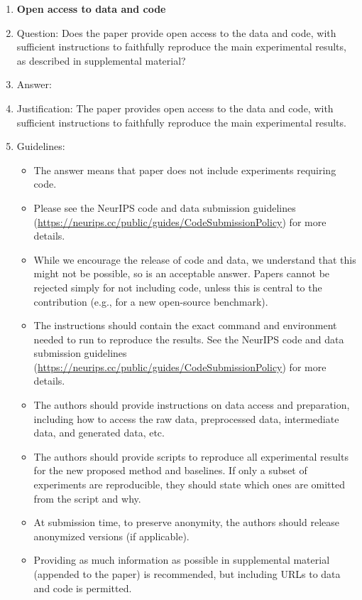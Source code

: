 \documentclass{article}
\begin{document}
\begin{enumerate}
\item {\bf Open access to data and code}
    \item[] Question: Does the paper provide open access to the data and code, with sufficient instructions to faithfully reproduce the main experimental results, as described in supplemental material?
    \item[] Answer: \answerYes{} %
    \item[] Justification: The paper provides open access to the data and code, with sufficient instructions to faithfully reproduce the main experimental results.
    \item[] Guidelines:
    \begin{itemize}
        \item The answer \answerNA{} means that paper does not include experiments requiring code.
        \item Please see the NeurIPS code and data submission guidelines (\url{https://neurips.cc/public/guides/CodeSubmissionPolicy}) for more details.
        \item While we encourage the release of code and data, we understand that this might not be possible, so \answerNo{} is an acceptable answer. Papers cannot be rejected simply for not including code, unless this is central to the contribution (e.g., for a new open-source benchmark).
        \item The instructions should contain the exact command and environment needed to run to reproduce the results. See the NeurIPS code and data submission guidelines (\url{https://neurips.cc/public/guides/CodeSubmissionPolicy}) for more details.
        \item The authors should provide instructions on data access and preparation, including how to access the raw data, preprocessed data, intermediate data, and generated data, etc.
        \item The authors should provide scripts to reproduce all experimental results for the new proposed method and baselines. If only a subset of experiments are reproducible, they should state which ones are omitted from the script and why.
        \item At submission time, to preserve anonymity, the authors should release anonymized versions (if applicable).
        \item Providing as much information as possible in supplemental material (appended to the paper) is recommended, but including URLs to data and code is permitted.
    \end{itemize}



\end{enumerate}
\end{document}
